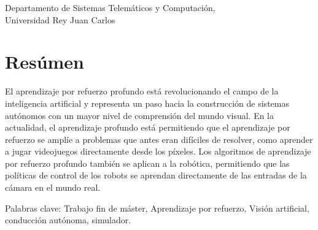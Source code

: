 
Departamento de Sistemas Telemáticos y Computación,\\
Universidad Rey Juan Carlos \setlength{\parskip}{0.5cm}

\thispagestyle{plain}			%
\setlength{\parskip}{0pt plus 1.0pt}
\section*{Resúmen}
El aprendizaje por refuerzo profundo está revolucionando el campo de la inteligencia artificial y representa un paso hacia la construcción de sistemas autónomos con un mayor nivel de comprensión del mundo visual. En la actualidad, el aprendizaje profundo está permitiendo que el aprendizaje por refuerzo se amplíe a problemas que antes eran difíciles de resolver, como aprender a jugar videojuegos directamente desde los píxeles. Los algoritmos de aprendizaje por refuerzo profundo también se aplican a la robótica, permitiendo que las políticas de control de los robots se aprendan directamente de las entradas de la cámara en el mundo real.

\vfill
Palabras clave: Trabajo fin de máster, Aprendizaje por refuerzo, Visión artificial, conducción autónoma, simulador.

\newpage				%
\thispagestyle{empty}
\mbox{}